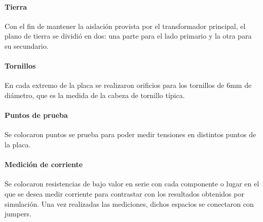 \paragraph{Tierra} 

Con el fin de mantener la aislación provista por el transformador principal, 
el plano de tierra se dividió en dos: una parte para el lado primario y la otra para su secundario.

\paragraph{Tornillos}

En cada extremo de la placa se realizaron orificios para los tornillos de 6mm de diámetro,
que es la medida de la cabeza de tornillo típica. 

\paragraph{Puntos de prueba}

Se colocaron puntos se prueba para poder medir tensiones en distintos puntos de la placa.

\paragraph{Medición de corriente} 

Se colocaron resistencias de bajo valor en serie con cada componente o lugar
en el que se desea medir corriente para contrastar con los resultados obtenidos por simulación.
Una vez realizadas las mediciones, dichos espacios se conectaron con jumpers.

